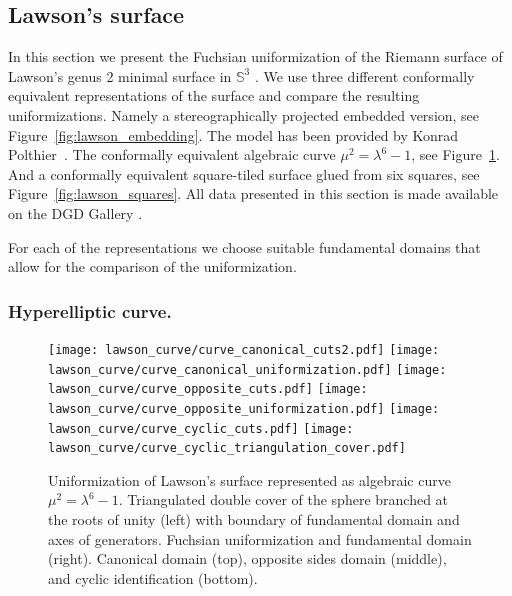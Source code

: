 \documentclass[Thesis]{subfiles}
\begin{document}
\subsection{Lawson's surface}

In this section we present the Fuchsian uniformization of the Riemann surface of Lawson's genus 2 minimal surface in $\mathbb{S}^3$ \cite{Law1970}.
We use three different conformally equivalent representations of the surface and compare the resulting uniformizations.
Namely a stereographically projected embedded version, see Figure~\ref{fig:lawson_embedding}.
The model has been provided by Konrad Polthier~\cite{polthier97}.
The conformally equivalent algebraic curve $\mu^2=\lambda^6-1$, see Figure~\ref{fig:lawson_curve}.
And a conformally equivalent square-tiled surface glued from six squares, see Figure~\ref{fig:lawson_squares}.
All data presented in this section is made available on the {\sc DGD Gallery} \cite{gallery-lawson-webpage}.

For each of the representations we choose suitable fundamental domains that allow for the comparison of the uniformization.

\subsubsection{Hyperelliptic curve.}
\label{sec:lawson_curve}

\begin{figure}
	\centering
	\resizebox{!}{6cm} {
	\texttt{[image: lawson\_curve/curve\_canonical\_cuts2.pdf]}
	\texttt{[image: lawson\_curve/curve\_canonical\_uniformization.pdf]}
	}
	\resizebox{!}{6cm} {
	\texttt{[image: lawson\_curve/curve\_opposite\_cuts.pdf]}
	\texttt{[image: lawson\_curve/curve\_opposite\_uniformization.pdf]}
	}
	\resizebox{!}{6cm} {
	\texttt{[image: lawson\_curve/curve\_cyclic\_cuts.pdf]}
	\texttt{[image: lawson\_curve/curve\_cyclic\_triangulation\_cover.pdf]}
	}
	\caption{Uniformization of Lawson's surface represented as algebraic curve $\mu^2=\lambda^6-1$. Triangulated double cover of the sphere branched at the roots of unity (left) with boundary of fundamental domain and axes of generators. Fuchsian uniformization and fundamental domain (right). Canonical domain (top), opposite sides domain (middle), and cyclic identification (bottom).}
	\label{fig:lawson_curve}
\end{figure}
\end{document}

